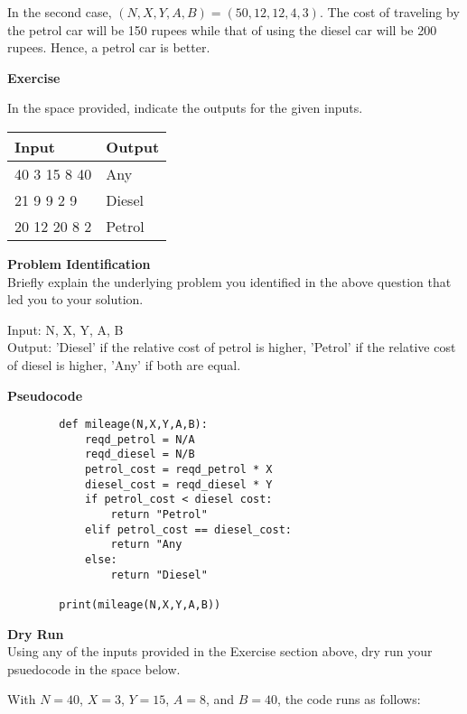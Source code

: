 \documentclass[a4paper]{exam}
\newcommand\heading[1]{\textbf{#1}}
\begin{document}
\begin{questions}
    In the second case, $(N,X,Y,A,B)=(50,12,12,4,3)$.  The cost of traveling by the petrol car will be 150 rupees while that of using the diesel car will be 200 rupees. Hence, a petrol car is better.

     \heading{Exercise}

    In the space provided, indicate the outputs for the given inputs.

    \begin{tabularx}{\textwidth}{|X|X|}
        \rowcolor{gray!50}
        \hline
        Input        & Output \\ \hline\hline
        40 3 15 8 40 & Any    \\\hline
        21 9 9 2 9   & Diesel \\\hline
        20 12 20 8 2 & Petrol \\\hline
    \end{tabularx}

    \heading{Problem Identification}\\
    Briefly explain the underlying problem you identified in the above question that led you to your solution.
    
 Input: N, X, Y, A, B \\
 Output: 'Diesel' if the relative cost of petrol is higher, 'Petrol' if the relative cost of diesel is higher, 'Any' if both are equal.

    \heading{Pseudocode}
    
    \begin{verbatim}
        def mileage(N,X,Y,A,B):
            reqd_petrol = N/A 
            reqd_diesel = N/B
            petrol_cost = reqd_petrol * X 
            diesel_cost = reqd_diesel * Y 
            if petrol_cost < diesel cost:
                return "Petrol"
            elif petrol_cost == diesel_cost:
                return "Any
            else:
                return "Diesel"

        print(mileage(N,X,Y,A,B))
    \end{verbatim}

    \heading{Dry Run}\\
    Using any of the inputs provided in the Exercise section above, dry run your psuedocode in the space below.


With $N=40$, $X=3$, $Y=15$, $A=8$, and $B=40$, the code runs as follows:


\end{questions}
\end{document}
